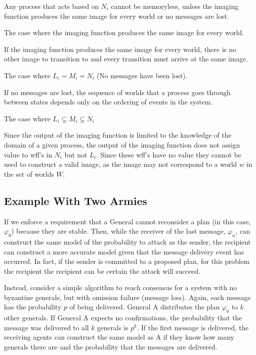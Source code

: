\begin{thm}
Any process that acts based on $N_i$ cannot be memoryless, unless the imaging function produces the same image for every world or no messages are lost.
\end{thm}

\begin{case}
The case where the imaging function produces the same image for every world.
\end{case}

If the imaging function produces the same image for every world, there is no other image to transition to and every transition must arrive at the same image.

\begin{case}
The case where $L_i = M_i = N_i$ (No messages have been lost).
\end{case}

If no messages are lost, the sequence of worlds that a process goes through between states depends only on the ordering of events in the system. 

\begin{case}
The case where $L_i \subsetneq M_i \subsetneq N_i$
\end{case}

Since the output of the imaging function is limited to the knowledge of the domain of a given process, the output of the imaging function does not assign value to wff's in $N_i$ but not $L_i$. Since these wff's have no value they cannot be used to construct a valid image, as the image may not correspond to a world $w$ in the set of worlds $W$.

\subsection{Example With Two Armies}

If we enforce a requirement that a General cannot reconsider a plan (in this case, $\varphi_0$) because they are stable. Then, while the receiver of the last message, $\varphi_n$, can construct the same model of the probability to attack as the sender, the recipient can construct a more accurate model given that the message delivery event has occurred. In fact, if the sender is committed to a proposed plan, for this problem the recipient the recipient can be certain the attack will succeed.

Instead, consider a simple algorithm to reach consensus for a system with no byzantine generals, but with omission failure (message loss). Again, each message has the probability $p$ of being delivered. General A distributes the plan $\varphi_0$ to $k$ other generals. If General A expects no confirmations, the probability that the message was delivered to all $k$ generals is $p^k$. If the first message is delivered, the receiving agents can construct the same model as A if they know how many generals there are and the probability that the messages are delivered.

